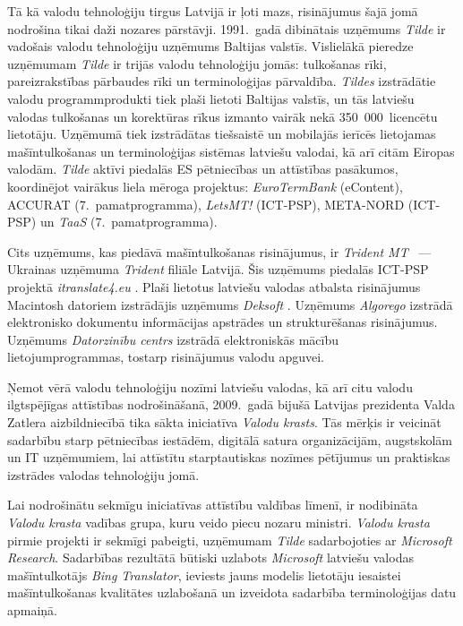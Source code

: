 \begin{multicols}{2}
Tā kā valodu tehnoloģiju tirgus Latvijā ir ļoti mazs, risinājumus šajā jomā nodrošina tikai daži nozares pārstāvji.
1991.~gadā dibinātais uzņēmums \textit{Tilde} \cite{Meta41} ir vadošais valodu tehnoloģiju uzņēmums Baltijas valstīs.
Vislielākā pieredze uzņēmumam \textit{Tilde} ir trijās valodu tehnoloģiju jomās: tulkošanas rīki, pareizrakstības pārbaudes rīki un terminoloģijas pārvaldība.
\textit{Tildes} izstrādātie valodu programmprodukti tiek plaši lietoti Baltijas valstīs, un tās latviešu valodas tulkošanas un korektūras rīkus izmanto vairāk nekā 350~000~licencētu lietotāju.
Uzņēmumā tiek izstrādātas tiešsaistē un mobilajās ierīcēs lietojamas mašīntulkošanas un terminoloģijas sistēmas latviešu valodai, kā arī citām Eiropas valodām.
\textit{Tilde} aktīvi piedalās ES pētniecības un attīstības pasākumos, koordinējot vairākus liela mēroga projektus: \textit{EuroTermBank} (eContent), ACCURAT (7.~pamatpro\-gramma), \textit{LetsMT!} (ICT-PSP), META-NORD (ICT-PSP) un \textit{TaaS} (7.~pamatprogramma).

Cits uzņēmums, kas piedāvā mašīntulkošanas risinājumus, ir \textit{Trident MT} \cite{Meta42}~--- Ukrainas uzņēmuma \textit{Trident} filiāle Latvijā.
Šis uzņēmums piedalās ICT-PSP projektā \textit{itranslate4.eu} \cite{Meta43}. 
Plaši lietotus latviešu valodas atbalsta risinājumus Macintosh datoriem izstrādājis uzņēmums \textit{Deksoft} \cite{MetaRef1}.
Uzņēmums \textit{Algorego} \cite{Meta44} izstrādā elektronisko dokumentu informācijas apstrādes un strukturēšanas risinājumus.
Uzņēmums \textit{Datorzinību centrs} \cite{Meta45} izstrādā elektroniskās mācību lietojumprogrammas, tostarp risinājumus valodu apguvei.

Ņemot vērā valodu tehnoloģiju nozīmi latviešu valodas, kā arī citu valodu ilgtspējīgas attīstības nodrošināšanā, 2009.~gadā bijušā Latvijas prezidenta Valda Zatlera aizbildniecībā tika sākta iniciatīva \textit{Valodu krasts}.
Tās mērķis ir veicināt sadarbību starp pētniecības iestādēm, digitālā satura organizācijām, augstskolām un IT uzņēmumiem, lai attīstītu starp\-tautiskas nozīmes pētījumus un praktiskas izstrādes valodas tehnoloģiju jomā.

Lai nodrošinātu sekmīgu iniciatīvas attīstību valdības līmenī, ir nodibināta \textit{Valodu krasta} vadības grupa, kuru veido piecu nozaru ministri.
\textit{Valodu krasta} pirmie projekti ir sekmīgi pabeigti, uzņēmumam \textit{Tilde} sadarbojoties ar \textit{Microsoft Research}.
Sadarbības rezultātā būtiski uzlabots \textit{Microsoft} latviešu valodas mašīntulkotājs \textit{Bing Translator}, ieviests jauns modelis lietotāju iesaistei mašīntulkošanas kvalitātes uzlabošanā un izveidota sadarbība terminoloģijas datu apmaiņā. 


\end{multicols}
